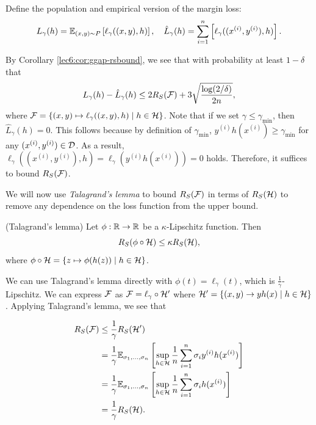 Define the population and empirical version of the margin loss:
\begin{equation}
L_\gamma(h) = \mathbb{E}_{(x,y)\sim P}\left[ \ell_\gamma((x,y), h)\right], \quad \hat{L}_\gamma(h) = \sum_{i=1}^n\left [\ell_\gamma((x^{(i)},y^{(i)}), h)\right].
\end{equation}

By Corollary \ref{lec6:cor:ggap-rsbound}, we see that with probability at least $1-\delta$ that
\begin{equation}
L_\gamma(h) - \hat{L}_\gamma(h)\leq 2R_S(\mathcal F) + 3\sqrt{\frac{\log (2/\delta)}{2n}},
\end{equation}
where $\mathcal F = \{(x,y)\mapsto \ell_\gamma((x,y), h)\mid h\in\mathcal H\}$. Note that if we set $\gamma\leq \gamma_{\min}$, then $\hat{L}_{\gamma}(h) = 0$. This follows because by definition of $\gamma_{\min}$, $y^{(i)}h(x^{(i)})\geq \gamma_{\min}$ for any $(x^{(i)}, y^{(i)})\in \mathcal D$. As a result, $\ell_\gamma((x^{(i)}, y^{(i)}), h) = \ell_\gamma(y^{(i)}h(x^{(i)})) = 0$ holds. Therefore, it suffices to bound $R_S(\mathcal F)$.

We will now use \textit{Talagrand's lemma} to bound $R_S(\mathcal F)$ in terms of $R_S(\mathcal H)$ to remove any dependence on the loss function from the upper bound. 
 
\begin{lemma}{(Talagrand's lemma)}
Let $\phi:\mathbb R\to\mathbb R$ be a $\kappa$-Lipschitz function. Then \begin{equation}
    R_S(\phi\circ \mathcal H)\leq \kappa R_S(\mathcal H),
\end{equation} 
where $\phi\circ\mathcal H = \{z\mapsto \phi(h(z))\mid h\in\mathcal H\}$.
\end{lemma}

We can use Talagrand's lemma directly with $\phi(t) = \ell_\gamma(t)$, which is $\frac{1}{\gamma}$-Lipschitz. We can express $\mathcal F$ as $\mathcal F=\ell_\gamma\circ\mathcal H'$ where $\mathcal H' = \{(x,y)\to yh(x)\mid h\in\mathcal H\}$. Applying Talagrand's lemma, we see that

\begin{align}
R_S(\mathcal F) &\leq \frac{1}{\gamma}R_S(\mathcal H') \\
&= \frac{1}{\gamma}\mathbb{E}_{\sigma_1,\dots, \sigma_n} \left[ \sup_{h\in \mathcal H} \frac{1}{n} \sum^n_{i=1} \sigma_i y^{(i)}h(x^{(i)}) \right] \\
&= \frac{1}{\gamma}\mathbb{E}_{\sigma_1,\dots, \sigma_n} \left[ \sup_{h\in \mathcal H} \frac{1}{n} \sum^n_{i=1} \sigma_i h(x^{(i)})  \right] \\
&= \frac{1}{\gamma}R_S(\mathcal H).
\end{align}

